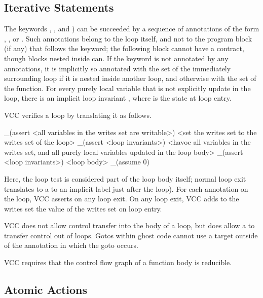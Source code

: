 \documentclass[preprint,nocopyrightspace]{sigplanconf}
\begin{document}
{{{\subsection{Iterative Statements}
The keywords , , and ) 
can be succeeded by a sequence of annotations of the form 
, , or 
. Such annotations belong to the loop itself, and
not to the program block (if any) that follows the keyword; the
following block cannot have a contract, though blocks nested inside
can. If the keyword is not annotated by any  annotations,
it is implicitly so annotated with the  set of the
immediately surrounding loop if it is nested inside another loop, and
otherwise with the  set of the function. For every
purely local variable  that is not explicitly update in the
loop, there is an implicit loop invariant ,
where  is the state at loop entry.

VCC verifies a loop by translating it as follows. 

\begin{VCC}
_(assert <all variables in the writes set are writable>)
<set the writes set to the writes set of the loop>
_(assert <loop invariants>)
<havoc all variables in the writes set, and all purely local variables
 updated in the loop body>
_(assert <loop invariants>)
<loop body>
_(assume 0)

\end{VCC}

Here, the loop test is considered part of the loop body itself; normal
loop exit translates to a  to an implicit label just after the
loop). For each annotation  on the loop, VCC asserts 
 on any loop exit. On any loop exit, VCC adds to the writes set
the value of the writes set on loop entry.

VCC does not allow control transfer into the body of a loop, but does
allow a  to transfer control out of loops.
Gotos within ghost code cannot use a target outside of
the  annotation in which the goto occurs.

VCC requires that the control flow graph of a function body is
reducible. 

\subsection{Atomic Actions}

}}}
\end{document}

